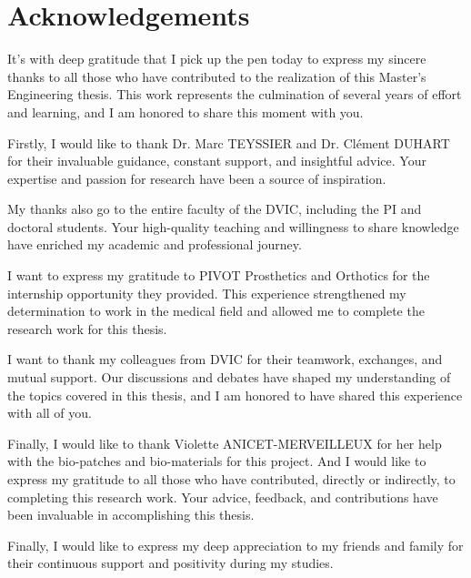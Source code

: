 \section*{Acknowledgements}
It’s with deep gratitude that I pick up the pen today to express my sincere thanks to all those who have contributed to the realization of this Master's Engineering thesis. This work represents the culmination of several years of effort and learning, and I am honored to share this moment with you.

Firstly, I would like to thank Dr. Marc TEYSSIER and Dr. Clément DUHART for their invaluable guidance, constant support, and insightful advice. Your expertise and passion for research have been a source of inspiration.

My thanks also go to the entire faculty of the DVIC, including the PI and doctoral students. Your high-quality teaching and willingness to share knowledge have enriched my academic and professional journey.

I want to express my gratitude to PIVOT Prosthetics and Orthotics for the internship opportunity they provided. This experience strengthened my determination to work in the medical field and allowed me to complete the research work for this thesis.

I want to thank my colleagues from DVIC for their teamwork, exchanges, and mutual support. Our discussions and debates have shaped my understanding of the topics covered in this thesis, and I am honored to have shared this experience with all of you.

Finally, I would like to thank Violette ANICET-MERVEILLEUX for her help with the bio-patches and bio-materials for this project. And I would like to express my gratitude to all those who have contributed, directly or indirectly, to completing this research work. Your advice, feedback, and contributions have been invaluable in accomplishing this thesis.

Finally, I would like to express my deep appreciation to my friends and family for their continuous support and positivity during my studies.